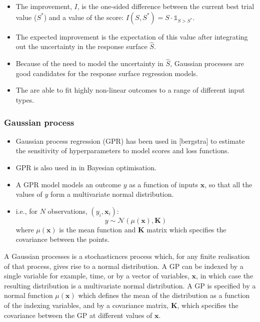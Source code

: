 \documentclass[journal=jacsat,manuscript=article]{achemso}
\begin{document}
\begin{itemize}
    \item The improvement, $I$, is the one-sided difference between the current best trial value ($S^{*}$) and a value of the score: $I(S, S^{*}) = S\cdot\mathbb{1}_{S>S^{*}}$. 
    \item The expected improvement is the expectation of this value after integrating out the uncertainty in the response surface $\hat{S}$. 
    \item Because of the need to model the uncertainty in $\hat{S}$, Gaussian processes are good candidates for the response surface regression models.
    \item The are able to fit highly non-linear outcomes to a range of different input types. 
\end{itemize}

\subsubsection{Gaussian process}

\begin{itemize}
    \item Gaussian process regression (GPR) has been used in [bergstra] to estimate the sensitivity of hyperparameters to model scores and loss functions. 
    \item GPR is also used in in Bayesian optimisation. 
    \item A GPR model models an outcome $y$ as a function of inputs $\mathbf{x}$, so that all the values of $y$ form a multivariate normal distribution. 
    \item i.e., for $N$ observations, $(y_{i}, \mathbf{x}_{i})$: 
    \begin{equation}
        y \sim \mathcal{N}\left(\mu(\mathbf{x}), \mathbf{K}\right )
    \end{equation}
    where $\mu(\mathbf{x})$ is the mean function and $\mathbf{K}$ matrix which specifies the covariance between the points. 
    
    
\end{itemize}

A Gaussian processes is a stochasticnces process which, for any finite realisation of that process, gives rise to a normal distribution.  A GP can be indexed by a single variable for example, time, or by a vector of variables, $\mathbf{x}$, in which case the resulting distribution is a multivariate normal distribution. A GP is specified by a normal function $\mu(\mathbf{x})$ which defines the mean of the distribution as a function of the indexing variables, and by a covariance matrix, $\mathbf{K}$, which specifies the covariance between the GP at different values of $\mathbf{x}$.  
\end{document}
